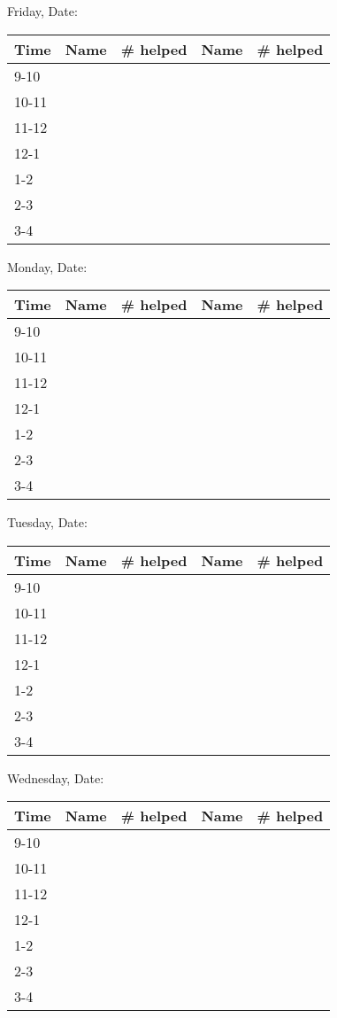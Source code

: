 \documentclass[10pt]{report}
\begin{document}
\noindent
Friday, Date:
\\
\begin{tabular}{|l|p{4cm}|l|p{4cm}|l|}
  \hline  Time   &  Name &  \# helped  &  Name  &  \# helped
  \\  \hline  9-10 &&&&
  \\  \hline  10-11 &&&&
  \\  \hline  11-12 &&&&
  \\  \hline  12-1 &&&&
  \\  \hline  1-2 &&&&
  \\  \hline  2-3 &&&&
  \\  \hline  3-4 &&&&
  \\ \hline
\end{tabular}

\newpage

\noindent
Monday, Date:
\\
\begin{tabular}{|l|p{4cm}|l|p{4cm}|l|}
  \hline  Time   &  Name &  \# helped  &  Name  &  \# helped
  \\  \hline  9-10 &&&&
  \\  \hline  10-11 &&&&
  \\  \hline  11-12 &&&&
  \\  \hline  12-1 &&&&
  \\  \hline  1-2 &&&&
  \\  \hline  2-3 &&&&
  \\  \hline  3-4 &&&&
  \\ \hline
\end{tabular}

\noindent
Tuesday, Date:
\\
\begin{tabular}{|l|p{4cm}|l|p{4cm}|l|}
  \hline  Time   &  Name &  \# helped  &  Name  &  \# helped
  \\  \hline  9-10 &&&&
  \\  \hline  10-11 &&&&
  \\  \hline  11-12 &&&&
  \\  \hline  12-1 &&&&
  \\  \hline  1-2 &&&&
  \\  \hline  2-3 &&&&
  \\  \hline  3-4 &&&&
  \\ \hline
\end{tabular}

\noindent
Wednesday, Date:
\\
\begin{tabular}{|l|p{4cm}|l|p{4cm}|l|}
  \hline  Time   &  Name &  \# helped  &  Name  &  \# helped
  \\  \hline  9-10 &&&&
  \\  \hline  10-11 &&&&
  \\  \hline  11-12 &&&&
  \\  \hline  12-1 &&&&
  \\  \hline  1-2 &&&&
  \\  \hline  2-3 &&&&
  \\  \hline  3-4 &&&&
  \\ \hline
\end{tabular}
\end{document}
